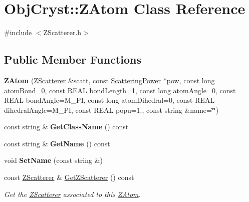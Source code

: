 \hypertarget{class_obj_cryst_1_1_z_atom}{}\section{Obj\+Cryst\+::Z\+Atom Class Reference}
\label{class_obj_cryst_1_1_z_atom}


{\ttfamily \#include $<$Z\+Scatterer.\+h$>$}

\subsection*{Public Member Functions}
\begin{DoxyCompactItemize}
\item 
\mbox{\label{class_obj_cryst_1_1_z_atom_abef15e9b63a090e6cf40a6837ea2ac24}} 
{\bfseries Z\+Atom} (\mbox{\hyperlink{class_obj_cryst_1_1_z_scatterer}{Z\+Scatterer}} \&scatt, const \mbox{\hyperlink{class_obj_cryst_1_1_scattering_power}{Scattering\+Power}} $\ast$pow, const long atom\+Bond=0, const R\+E\+AL bond\+Length=1, const long atom\+Angle=0, const R\+E\+AL bond\+Angle=M\+\_\+\+PI, const long atom\+Dihedral=0, const R\+E\+AL dihedral\+Angle=M\+\_\+\+PI, const R\+E\+AL popu=1., const string \&name=\char`\"{}\char`\"{})
\item 
\mbox{\label{class_obj_cryst_1_1_z_atom_a841fad3e3794ffa5e4ef8d39f9f8f26a}} 
const string \& {\bfseries Get\+Class\+Name} () const
\item 
\mbox{\label{class_obj_cryst_1_1_z_atom_ab19dd126b4e3830c50a4d69ab702c29c}} 
const string \& {\bfseries Get\+Name} () const
\item 
\mbox{\label{class_obj_cryst_1_1_z_atom_a6cca6a4b33e91ce1bb1a8912f9ba5a53}} 
void {\bfseries Set\+Name} (const string \&)
\item 
\mbox{\label{class_obj_cryst_1_1_z_atom_a247a7d153559e707ffea310bc797e5fd}} 
const \mbox{\hyperlink{class_obj_cryst_1_1_z_scatterer}{Z\+Scatterer}} \& \mbox{\hyperlink{class_obj_cryst_1_1_z_atom_a247a7d153559e707ffea310bc797e5fd}{Get\+Z\+Scatterer}} () const
\begin{DoxyCompactList}\small\item\em Get the \mbox{\hyperlink{class_obj_cryst_1_1_z_scatterer}{Z\+Scatterer}} associated to this \mbox{\hyperlink{class_obj_cryst_1_1_z_atom}{Z\+Atom}}. \end{DoxyCompactList}\item 

\end{DoxyCompactItemize}
